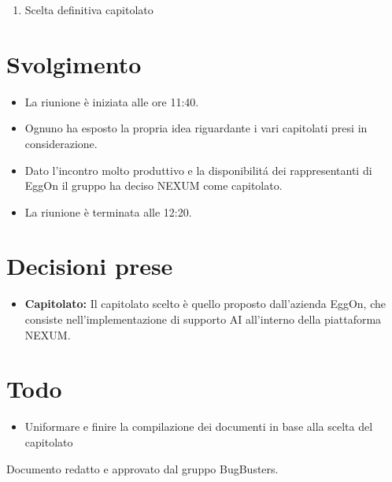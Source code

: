 \documentclass[a4paper,12pt]{article}
\begin{document}
\begin{enumerate}
    \item Scelta definitiva capitolato
\end{enumerate}

\section{Svolgimento}

\begin{itemize}
    \item La riunione è iniziata alle ore 11:40.
    \item Ognuno ha esposto la propria idea riguardante i vari capitolati presi in considerazione.
    \item Dato l'incontro molto produttivo e la disponibilitá dei rappresentanti di EggOn il gruppo ha deciso NEXUM come capitolato.
    \item La riunione è terminata alle 12:20.
\end{itemize}

\section{Decisioni prese}

\begin{itemize}
    \item \textbf{Capitolato:} Il capitolato scelto è quello proposto dall'azienda EggOn, che consiste nell'implementazione di supporto AI all'interno della piattaforma NEXUM.
\end{itemize}

\section{Todo}

\begin{tcolorbox}[colback=secondaryblue!8,colframe=secondaryblue!60,arc=2mm,boxrule=0.5pt,left=10pt,right=10pt]
\begin{itemize}[topsep=5pt]
    \item Uniformare e finire la compilazione dei documenti in base alla scelta del capitolato
\end{itemize}
\end{tcolorbox}

\vfill
\begin{center}
    {\small\color{darkgray} Documento redatto e approvato dal gruppo BugBusters.}
\end{center}
\end{document}
